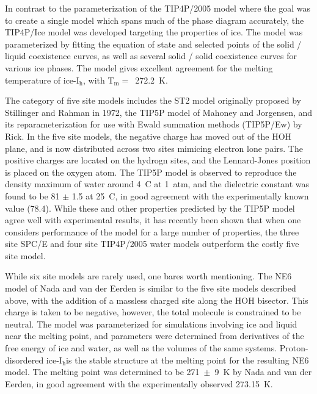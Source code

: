 In contrast to the parameterization of the TIP4P/2005 model where the
goal was to create a single model which spans much of the phase
diagram accurately, the TIP4P/Ice model was developed targeting the
properties of ice. The model was parameterized by fitting the equation
of state and selected points of the solid / liquid coexistence curves,
as well as several solid / solid coexistence curves for various ice
phases. The model gives excellent agreement for the melting
temperature of ice-I$_\mathrm{h}$, with T$_\mathrm{m} = $~272.2~K.

The category of five site models includes the ST2 model originally
proposed by Stillinger and Rahman in 1972\cite{Stillinger1974}, the
TIP5P model of Mahoney and Jorgensen\cite{Mahoney2000}, and its
reparameterization for use with Ewald summation methods (TIP5P/Ew) by
Rick.\cite{Rick2004} In the five site models, the negative charge has
moved out of the HOH plane, and is now distributed across two sites
mimicing electron lone pairs. The positive charges are located on
the hydrogn sites, and the Lennard-Jones position is placed on the
oxygen atom. The TIP5P model is observed to reproduce the density
maximum of water around 4\degree~C at 1~atm, and the dielectric
constant was found to be 81 $\pm$ 1.5 at 25\degree~C, in good
agreement with the experimentally known value (78.4). While these and
other properties predicted by the TIP5P model agree well with
experimental results, it has recently been shown that when one
considers performance of the model for a large number of properties,
the three site SPC/E and four site TIP4P/2005 water models outperform
the costly five site model. \cite{Vega2011a}

While six site models are rarely used, one bares worth mentioning. The
NE6 model of Nada and van der Eerden is similar to the five site
models described above, with the addition of a massless charged site
along the HOH bisector.\cite{Nada2003a} This charge is taken to be
negative, however, the total molecule is constrained to be
neutral. The model was parameterized for simulations involving ice and
liquid near the melting point, and parameters were determined from
derivatives of the free energy of ice and water, as well as the
volumes of the same systems. Proton-disordered ice-I$_\mathrm{h}$is
the stable structure at the melting point for the resulting NE6
model. The melting point was determined to be 271~$\pm$~9~K by Nada
and van der Eerden, in good agreement with the experimentally observed
273.15~K.

